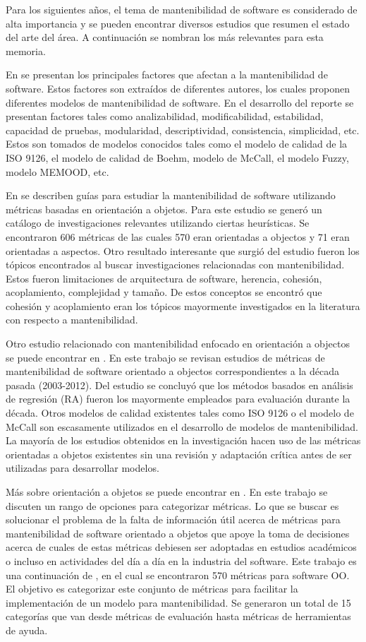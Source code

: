 Para los siguientes años, el tema de mantenibilidad de software es considerado
de alta importancia y se pueden encontrar diversos estudios que resumen
el estado del arte del área. A continuación se nombran los más relevantes
para esta memoria.

En \cite{survey} se presentan los principales factores que afectan a la mantenibilidad de
software. Estos factores son extraídos de diferentes autores, los cuales 
proponen diferentes modelos de mantenibilidad de software.
En el desarrollo del reporte se presentan factores tales como 
analizabilidad, modificabilidad, estabilidad, capacidad de pruebas, modularidad,
descriptividad, consistencia, simplicidad, etc. Estos son tomados de modelos
conocidos tales como el modelo de calidad de la ISO 9126, el modelo de calidad
de Boehm, modelo de McCall, el modelo Fuzzy, modelo MEMOOD, etc.

En \cite{roadmap} se describen guías para estudiar la mantenibilidad de software
utilizando métricas basadas en orientación a objetos. Para este estudio
se generó un catálogo de investigaciones relevantes utilizando
ciertas heurísticas. Se encontraron 606 métricas de las cuales 570 eran 
orientadas a objectos y 71 eran orientadas a aspectos. Otro resultado
interesante que surgió del estudio fueron los tópicos encontrados al buscar
investigaciones relacionadas con mantenibilidad. Estos fueron limitaciones
de arquitectura de software, herencia, cohesión, acoplamiento, complejidad
y tamaño. De estos conceptos se encontró que cohesión y acoplamiento eran
los tópicos mayormente investigados en la literatura con respecto a mantenibilidad.

Otro estudio relacionado con mantenibilidad enfocado en orientación a objectos
se puede encontrar en \cite{pastDecade}. En este trabajo se revisan estudios
de métricas de mantenibilidad de software orientado a objectos correspondientes
a la década pasada (2003-2012). Del estudio se concluyó que los métodos
basados en análisis de regresión (RA) fueron los mayormente empleados para
evaluación durante la década. Otros modelos de calidad existentes tales como
ISO 9126 o el modelo de McCall son escasamente utilizados en el desarrollo
de modelos de mantenibilidad. La mayoría de los estudios obtenidos en la investigación
hacen uso de las métricas orientadas a objetos existentes sin una revisión
y adaptación crítica antes de ser utilizadas para desarrollar modelos.

Más sobre orientación a objetos se puede encontrar en \cite{TowardsACatalog}. 
En este trabajo se discuten un rango de opciones para categorizar métricas. 
Lo que se buscar es solucionar el problema de la falta de información útil 
acerca de métricas para mantenibilidad de software orientado a objetos que 
apoye la toma de decisiones acerca de cuales de estas métricas debiesen ser 
adoptadas en estudios académicos o incluso en actividades del día a día en la 
industria del software. Este trabajo es una continuación de \cite{roadmap}, 
en el cual se encontraron 570 métricas para software OO. El objetivo es
categorizar este conjunto de métricas para facilitar la implementación de un 
modelo para mantenibilidad. Se generaron un total de 15 categorías que van 
desde métricas de evaluación hasta métricas de herramientas de ayuda.

